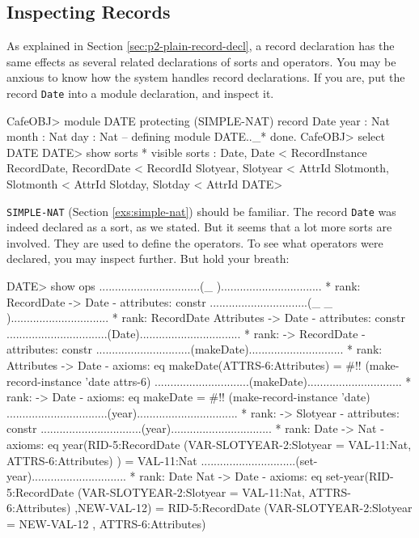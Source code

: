 \documentclass[a4paper]{memoir}
\begin{document}
\newpage
\subsection{Inspecting Records}\label{sec:p2-record-inspection}

As explained in Section \ref{sec:p2-plain-record-decl}, a record
declaration has the same effects as several related declarations
of sorts and operators. You may be anxious to know how the system
handles record declarations. If you are, put the record \verb|Date|
into a module declaration, and inspect it.\label{exs:date}
\begin{vvtm}
\begin{ccode}
CafeOBJ> module DATE {
  protecting (SIMPLE-NAT)
  record Date {
    year  : Nat
    month : Nat
    day   : Nat
 } }
  -- defining module DATE.._* done.
  CafeOBJ> select DATE
  DATE> show sorts
  * visible sorts :
    Date, Date < RecordInstance
    RecordDate, RecordDate < RecordId
    Slotyear, Slotyear < AttrId
    Slotmonth, Slotmonth < AttrId
    Slotday, Slotday < AttrId
  DATE>
\end{ccode}
\end{vvtm}
\verb|SIMPLE-NAT| (Section \ref{exs:simple-nat}) should be familiar.
The record \verb|Date| was indeed declared as a sort, as we stated.
But it seems that a lot more sorts are involved. They are used to define
the operators. To see what operators were declared, you may inspect
further. But hold your breath:
\begin{vvtm}
\begin{ccode}
DATE> show ops
................................(_ { })................................
  * rank: RecordDate -> Date
    - attributes:  { constr }
...............................(_ { _ })...............................
  * rank: RecordDate Attributes -> Date
    - attributes:  { constr }
................................(Date)................................
  * rank: -> RecordDate
    - attributes:  { constr }
..............................(makeDate)..............................
  * rank: Attributes -> Date
    - axioms:
      eq makeDate(ATTRS-6:Attributes) = #!! (make-record-instance 'date
                                             attrs-6)
..............................(makeDate)..............................
  * rank: -> Date
    - axioms:
      eq makeDate = #!! (make-record-instance 'date)
................................(year)................................
  * rank: -> Slotyear
    - attributes:  { constr }
................................(year)................................
  * rank: Date -> Nat
    - axioms:
      eq year(RID-5:RecordDate { (VAR-SLOTYEAR-2:Slotyear = VAL-11:Nat, 
          ATTRS-6:Attributes) }) = VAL-11:Nat
..............................(set-year)..............................
  * rank: Date Nat -> Date
    - axioms:
      eq set-year(RID-5:RecordDate { (VAR-SLOTYEAR-2:Slotyear = VAL-11:Nat, 
          ATTRS-6:Attributes) },NEW-VAL-12) = RID-5:RecordDate
          { (VAR-SLOTYEAR-2:Slotyear =  NEW-VAL-12 , ATTRS-6:Attributes) }
\end{ccode}
\end{vvtm}
\end{document}
